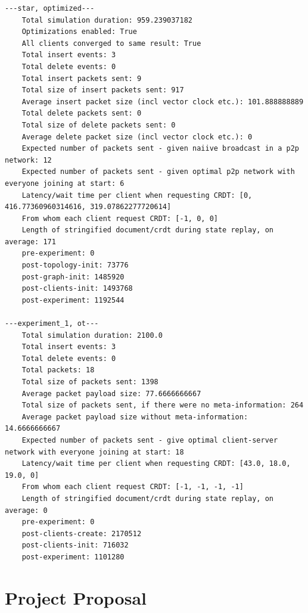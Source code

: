 \documentclass[12pt,a4paper,twoside,openright]{report}
\begin{document}
\begin{verbatim}
---star, optimized---
	Total simulation duration: 959.239037182
	Optimizations enabled: True
	All clients converged to same result: True
	Total insert events: 3
	Total delete events: 0
	Total insert packets sent: 9
	Total size of insert packets sent: 917
	Average insert packet size (incl vector clock etc.): 101.888888889
	Total delete packets sent: 0
	Total size of delete packets sent: 0
	Average delete packet size (incl vector clock etc.): 0
	Expected number of packets sent - given naiive broadcast in a p2p network: 12
	Expected number of packets sent - given optimal p2p network with everyone joining at start: 6
	Latency/wait time per client when requesting CRDT: [0, 416.77360960314616, 319.07862277720614]
	From whom each client request CRDT: [-1, 0, 0]
	Length of stringified document/crdt during state replay, on average: 171
	pre-experiment: 0
	post-topology-init: 73776
	post-graph-init: 1485920
	post-clients-init: 1493768
	post-experiment: 1192544

---experiment_1, ot---
	Total simulation duration: 2100.0
	Total insert events: 3
	Total delete events: 0
	Total packets: 18
	Total size of packets sent: 1398
	Average packet payload size: 77.6666666667
	Total size of packets sent, if there were no meta-information: 264
	Average packet payload size without meta-information: 14.6666666667
	Expected number of packets sent - give optimal client-server network with everyone joining at start: 18
	Latency/wait time per client when requesting CRDT: [43.0, 18.0, 19.0, 0]
	From whom each client request CRDT: [-1, -1, -1, -1]
	Length of stringified document/crdt during state replay, on average: 0
	pre-experiment: 0
	post-clients-create: 2170512
	post-clients-init: 716032
	post-experiment: 1101280

\end{verbatim}

\chapter{Project Proposal}


\end{document}
